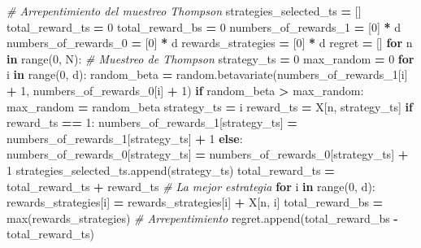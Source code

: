 \documentclass[
]{book}
\newenvironment{Shaded}{\begin{snugshade}}{\end{snugshade}}
\newcommand{\BuiltInTok}[1]{#1}
\newcommand{\CommentTok}[1]{\textcolor[rgb]{0.56,0.35,0.01}{\textit{#1}}}
\newcommand{\ControlFlowTok}[1]{\textcolor[rgb]{0.13,0.29,0.53}{\textbf{#1}}}
\newcommand{\DecValTok}[1]{\textcolor[rgb]{0.00,0.00,0.81}{#1}}
\newcommand{\KeywordTok}[1]{\textcolor[rgb]{0.13,0.29,0.53}{\textbf{#1}}}
\newcommand{\NormalTok}[1]{#1}
\newcommand{\OperatorTok}[1]{\textcolor[rgb]{0.81,0.36,0.00}{\textbf{#1}}}
\begin{document}
\begin{Shaded}
\begin{Highlighting}[]
\CommentTok{\# Arrepentimiento del muestreo Thompson}
\NormalTok{strategies\_selected\_ts }\OperatorTok{=}\NormalTok{ []}
\NormalTok{total\_reward\_ts }\OperatorTok{=} \DecValTok{0}
\NormalTok{total\_reward\_bs }\OperatorTok{=} \DecValTok{0}
\NormalTok{numbers\_of\_rewards\_1 }\OperatorTok{=}\NormalTok{ [}\DecValTok{0}\NormalTok{] }\OperatorTok{*}\NormalTok{ d}
\NormalTok{numbers\_of\_rewards\_0 }\OperatorTok{=}\NormalTok{ [}\DecValTok{0}\NormalTok{] }\OperatorTok{*}\NormalTok{ d}
\NormalTok{rewards\_strategies }\OperatorTok{=}\NormalTok{ [}\DecValTok{0}\NormalTok{] }\OperatorTok{*}\NormalTok{ d}
\NormalTok{regret }\OperatorTok{=}\NormalTok{ []}
\ControlFlowTok{for}\NormalTok{ n }\KeywordTok{in} \BuiltInTok{range}\NormalTok{(}\DecValTok{0}\NormalTok{, N):}
    \CommentTok{\# Muestreo de Thompson}
\NormalTok{    strategy\_ts }\OperatorTok{=} \DecValTok{0}
\NormalTok{    max\_random }\OperatorTok{=} \DecValTok{0}
    \ControlFlowTok{for}\NormalTok{ i }\KeywordTok{in} \BuiltInTok{range}\NormalTok{(}\DecValTok{0}\NormalTok{, d):}
\NormalTok{        random\_beta }\OperatorTok{=}\NormalTok{ random.betavariate(numbers\_of\_rewards\_1[i] }\OperatorTok{+} \DecValTok{1}\NormalTok{,}
\NormalTok{                                         numbers\_of\_rewards\_0[i] }\OperatorTok{+} \DecValTok{1}\NormalTok{)}
        \ControlFlowTok{if}\NormalTok{ random\_beta }\OperatorTok{\textgreater{}}\NormalTok{ max\_random:}
\NormalTok{            max\_random }\OperatorTok{=}\NormalTok{ random\_beta}
\NormalTok{            strategy\_ts }\OperatorTok{=}\NormalTok{ i}
\NormalTok{    reward\_ts }\OperatorTok{=}\NormalTok{ X[n, strategy\_ts]}
    \ControlFlowTok{if}\NormalTok{ reward\_ts }\OperatorTok{==} \DecValTok{1}\NormalTok{:}
\NormalTok{        numbers\_of\_rewards\_1[strategy\_ts] }\OperatorTok{=}\NormalTok{ numbers\_of\_rewards\_1[strategy\_ts] }\OperatorTok{+} \DecValTok{1}
    \ControlFlowTok{else}\NormalTok{:}
\NormalTok{        numbers\_of\_rewards\_0[strategy\_ts] }\OperatorTok{=}\NormalTok{ numbers\_of\_rewards\_0[strategy\_ts] }\OperatorTok{+} \DecValTok{1}
\NormalTok{    strategies\_selected\_ts.append(strategy\_ts)}
\NormalTok{    total\_reward\_ts }\OperatorTok{=}\NormalTok{ total\_reward\_ts }\OperatorTok{+}\NormalTok{ reward\_ts}
    \CommentTok{\# La mejor estrategia}
    \ControlFlowTok{for}\NormalTok{ i }\KeywordTok{in} \BuiltInTok{range}\NormalTok{(}\DecValTok{0}\NormalTok{, d):}
\NormalTok{        rewards\_strategies[i] }\OperatorTok{=}\NormalTok{ rewards\_strategies[i] }\OperatorTok{+}\NormalTok{ X[n, i]}
\NormalTok{    total\_reward\_bs }\OperatorTok{=} \BuiltInTok{max}\NormalTok{(rewards\_strategies)}
    \CommentTok{\# Arrepentimiento}
\NormalTok{    regret.append(total\_reward\_bs }\OperatorTok{{-}}\NormalTok{ total\_reward\_ts)}
\end{Highlighting}
\end{Shaded}
\end{document}
